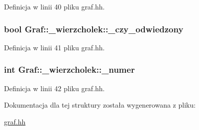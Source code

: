 \-Definicja w linii 40 pliku graf.\-hh.

\hypertarget{struct_graf_1_1__wierzcholek_a818c370b6e8a476f6fb9f89ccac01e2f}{
\subsubsection[{\-\_\-czy\-\_\-odwiedzony}]{\setlength{\rightskip}{0pt plus 5cm}bool {\bf \-Graf\-::\-\_\-wierzcholek\-::\-\_\-czy\-\_\-odwiedzony}}}\label{struct_graf_1_1__wierzcholek_a818c370b6e8a476f6fb9f89ccac01e2f}


\-Definicja w linii 41 pliku graf.\-hh.

\hypertarget{struct_graf_1_1__wierzcholek_a966ecd51ba3e337c8b67587cffab7f9a}{
\subsubsection[{\-\_\-numer}]{\setlength{\rightskip}{0pt plus 5cm}int {\bf \-Graf\-::\-\_\-wierzcholek\-::\-\_\-numer}}}\label{struct_graf_1_1__wierzcholek_a966ecd51ba3e337c8b67587cffab7f9a}


\-Definicja w linii 42 pliku graf.\-hh.



\-Dokumentacja dla tej struktury została wygenerowana z pliku\-:\begin{DoxyCompactItemize}
\item 
\hyperlink{graf_8hh}{graf.\-hh}\end{DoxyCompactItemize}
